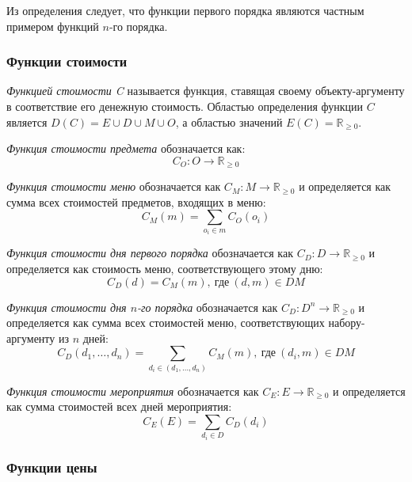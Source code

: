 Из определения следует, что функции первого порядка являются частным примером функций $n$-го порядка.

\subsubsection{Функции стоимости}

\textit{Функцией стоимости C} называется функция, ставящая своему объекту-аргументу в соответствие его денежную стоимость. Областью определения функции $C$ является $D(C) = E \cup D \cup M \cup O$, а областью значений $E(C) = \mathbb{R}_{\ge 0}$.

\textit{Функция стоимости предмета} обозначается как:
\begin{equation}
	C_O: O \rightarrow \mathbb{R}_{\ge 0}
\end{equation}

\textit{Функция стоимости меню} обозначается как $C_M: M \rightarrow \mathbb{R}_{\ge 0}$ и определяется как сумма всех стоимостей предметов, входящих в меню:
\begin{equation}
	C_M(m) = \sum_{o_i \in m} C_O(o_i)
\end{equation}

\textit{Функция стоимости дня первого порядка} обозначается как \newline $C_D: D \rightarrow \mathbb{R}_{\ge 0}$ и определяется как стоимость меню, соответствующего этому дню:
\begin{equation}
	C_D(d) = C_M(m), \ \text{где} \ (d, m) \in DM
\end{equation}

\textit{Функция стоимости дня $n$-го порядка} обозначается как $C_D: D^n \rightarrow \mathbb{R}_{\ge 0}$ \newline и определяется как сумма всех стоимостей меню, соответствующих \newline набору-аргументу из $n$ дней:
\begin{equation}
	C_D(d_1, \dots, d_n) = \sum_{d_i \in (d_1, \dots, d_n)}{C_M(m)}, \ \text{где} \ (d_i, m) \in DM
\end{equation}

\textit{Функция стоимости мероприятия} обозначается как $C_E: E \rightarrow \mathbb{R}_{\ge 0}$ и определяется как сумма стоимостей всех дней мероприятия:
\begin{equation}
	C_E(E) = \sum_{d_i \in D} C_D(d_i)
	\label{eq:cost-event}
\end{equation}

\subsubsection{Функции цены}

